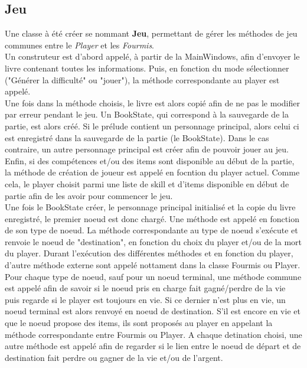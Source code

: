 		\subsection{Jeu}
		Une classe à été créer se nommant \textbf{Jeu}, permettant de gérer les méthodes de jeu communes entre le \textit{Player} et les \textit{Fourmis}.\\
		Un construteur est d'abord appelé, à partir de la MainWindows, afin d'envoyer le livre contenant toutes les informations. Puis, en fonction du mode sélectionner ("Générer la difficulté" ou "jouer"), la méthode correspondante au player est appelé.\\
		Une fois dans la méthode choisis, le livre est alors copié afin de ne pas le modifier par erreur pendant le jeu. Un BookState, qui correspond à la sauvegarde de la partie, est alors créé. Si le prélude contient un personnage principal, alors celui ci est enregistré dans la sauvegarde de la partie (le BookState). Dans le cas contraire, un autre personnage principal est créer afin de pouvoir jouer au jeu.\\
		Enfin, si des compétences et/ou des items sont disponible au début de la partie, la méthode de création de joueur est appelé en focntion du player actuel. Comme cela, le player choisit parmi une liste de skill et d'items disponible en début de partie afin de les avoir pour commencer le jeu.\\
		Une fois le BookState créer, le personnage principal initialisé et la copie du livre enregistré, le premier noeud est donc chargé. Une méthode est appelé en fonction de son type de noeud. La méthode correspondante au type de noeud s'exécute et renvoie le noeud de "destination", en fonction du choix du player et/ou de la mort du player. Durant l'exécution des différentes méthodes et en fonction du player, d'autre méthode externe sont appelé nottament dans la classe Fourmis ou Player.\\
		Pour chaque type de noeud, sauf pour un noeud terminal, une méthode commune est appelé afin de savoir si le noeud pris en charge fait gagné/perdre de la vie puis regarde si le player est toujours en vie. Si ce dernier n'est plus en vie, un noeud terminal est alors renvoyé en noeud de destination. S'il est encore en vie et que le noeud propose des items, ils sont proposés au player en appelant la méthode correspondante entre Fourmis ou Player. A chaque detination choisi, une autre méthode est appelé afin de regarder si le lien entre le noeud de départ et de destination fait perdre ou gagner de la vie et/ou de l'argent.\\


